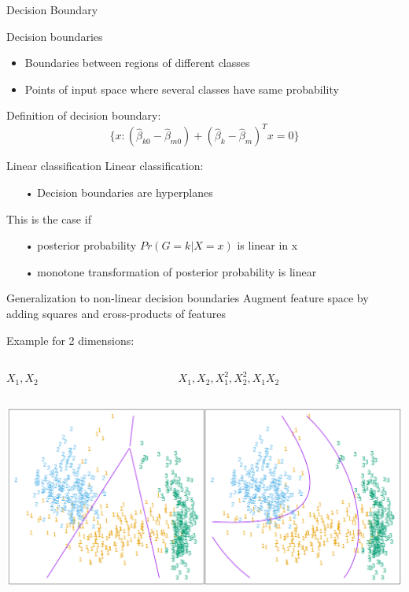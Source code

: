 \documentclass{beamer}
\begin{document}
\begin{frame}{Decision Boundary}

\vspace{0.2cm}
Decision boundaries 
\begin{itemize}
\item Boundaries between regions of different classes
\item Points of input space where several classes have same probability
\end{itemize}
\vspace{0.2cm}
Definition of decision boundary:
\begin{equation*}
\{ x:(\hat{\beta}_{k0} - \hat{\beta}_{m0}) + 
(\hat{\beta}_{k} - \hat{\beta}_{m})^Tx = 0\}
\end{equation*}
\end{frame}


\begin{frame}{Linear classification}
Linear classification:
\begin{itemize}
\item[•] Decision boundaries are hyperplanes
\end{itemize}
\pause
This is the case if 
\begin{itemize}
\item[•] posterior probability $Pr(G=k|X=x)$ is linear in x
\item[•] monotone transformation of posterior probability is linear
\end{itemize}
\end{frame}


\begin{frame}{Generalization to non-linear decision boundaries}
Augment feature space by adding squares and cross-products of features

\vspace{0.2cm}
Example for 2 dimensions:
\begin{columns}
\begin{column}{0.5\textwidth}
\begin{center}
$X_1,X_2$
\end{center}
\end{column}
\begin{column}{0.5\textwidth}
\begin{center}
$X_1,X_2,X_1^2, X_2^2, X_1 X_2$
\end{center}
\end{column}
\end{columns}

\includegraphics[width=\textwidth]{AugmentedFeatures.png}
\end{frame}
\end{document}
